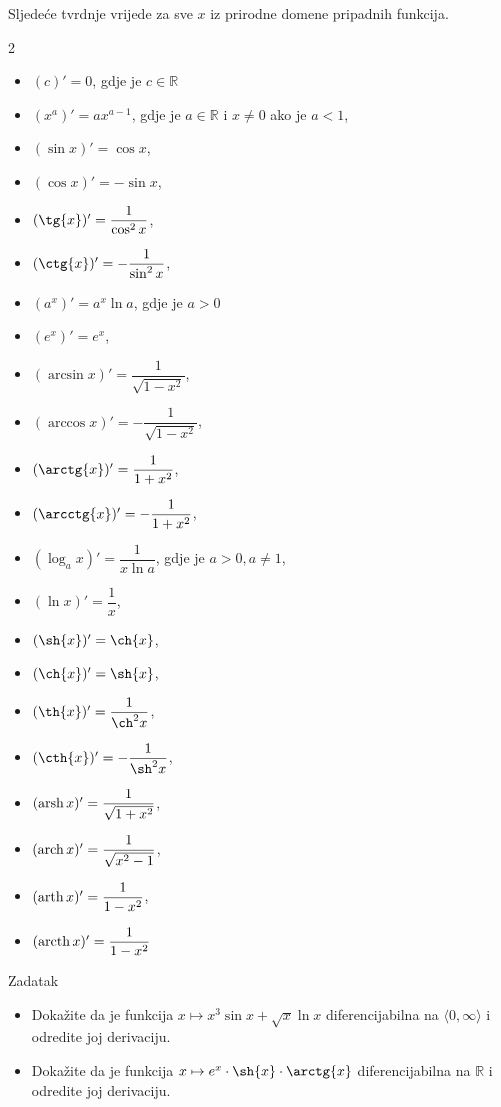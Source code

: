 \begin{remark} Sljedeće tvrdnje vrijede za sve \(x\) iz prirodne domene pripadnih funkcija.
\begin{multicols}{2}
\begin{itemize}
\item \((c)'=0\), gdje je \(c\in \mathbb{R}\)
\item \((x^a)'=ax^{a-1}\), gdje je \(a\in\mathbb{R}\) i \(x\neq 0\) ako je \(a<1\),
\item \((\sin{x})'=\cos{x}\),
\item \((\cos{x})'=-\sin{x}\),
\item \((\tg{x})'=\dfrac{1}{\cos^2{x}}\),
\item \((\ctg{x})'=-\dfrac{1}{\sin^2{x}}\),
\item \((a^x)'=a^x\ln{a}\), gdje je \(a>0\)
\item \((e^x)'=e^x\),
\item \((\arcsin{x})'=\dfrac{1}{\sqrt{1-x^2}}\),
\item \((\arccos{x})'=-\dfrac{1}{\sqrt{1-x^2}}\),
\item \((\arctg{x})'=\dfrac{1}{1+x^2}\),
\item \((\arcctg{x})'=-\dfrac{1}{1+x^2}\),
\item \((\log_a{x})'=\dfrac{1}{x\ln{a}}\), gdje je \(a>0, a\neq 1\),
\item \((\ln{x})'=\dfrac{1}{x}\),
\item \((\sh{x})'=\ch{x}\),
\item \((\ch{x})'=\sh{x}\),
\item \((\th{x})'=\dfrac{1}{\ch^2{x}}\),
\item \((\cth{x})'=-\dfrac{1}{\sh^2{x}}\),
\item \((\operatorname{arsh}{x})'=\dfrac{1}{\sqrt{1+x^2}}\),
\item \((\operatorname{arch}{x})'=\dfrac{1}{\sqrt{x^2-1}}\),
\item \((\operatorname{arth}{x})'=\dfrac{1}{1-x^2}\),
\item \((\operatorname{arcth}{x})'=\dfrac{1}{1-x^2}\)
\end{itemize}
\end{multicols}
\end{remark}
\begin{exercise}{Zadatak} \textbf{}
\begin{itemize}
\item[a)] Dokažite da je funkcija \(x\mapsto x^3\sin{x}+\sqrt{x}\ln{x}\) diferencijabilna na \(\langle 0,\infty\rangle\) i odredite joj derivaciju.
\item[b)] Dokažite da je funkcija \(x\mapsto e^x\cdot\sh{x}\cdot\arctg{x}\) diferencijabilna na \(\mathbb{R}\) i odredite joj derivaciju.
\end{itemize}
\end{exercise}
